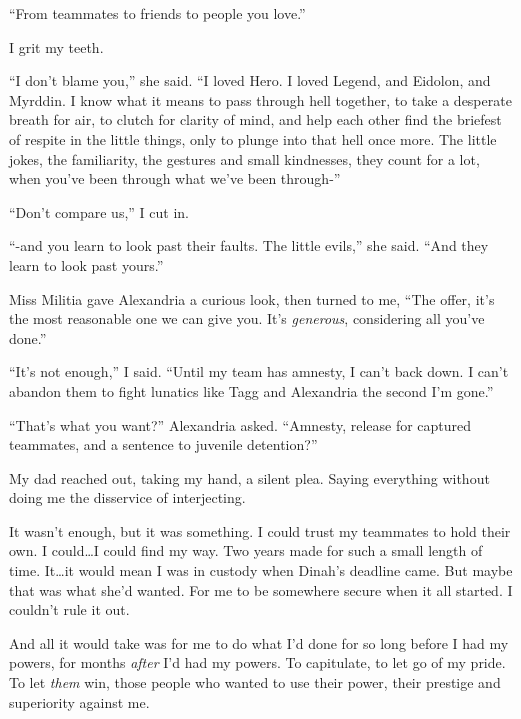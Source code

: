 ``From teammates to friends to people you love.''



I grit my teeth.



``I don't blame you,'' she said.  ``I loved Hero.  I loved Legend, and Eidolon, and Myrddin.  I know what it means to pass through hell together, to take a desperate breath for air, to clutch for clarity of mind, and help each other find the briefest of respite in the little things, only to plunge into that hell once more.  The little jokes, the familiarity, the gestures and small kindnesses, they count for a lot, when you've been through what we've been through-''



``Don't compare us,'' I cut in.



``-and you learn to look past their faults.  The little evils,'' she said.  ``And they learn to look past yours.''



Miss Militia gave Alexandria a curious look, then turned to me, ``The offer, it's the most reasonable one we can give you.  It's \emph{generous}, considering all you've done.''



``It's not enough,'' I said.  ``Until my team has amnesty, I can't back down.  I can't abandon them to fight lunatics like Tagg and Alexandria the second I'm gone.''



``That's what you want?'' Alexandria asked.  ``Amnesty, release for captured teammates, and a sentence to juvenile detention?''



My dad reached out, taking my hand, a silent plea.  Saying everything without doing me the disservice of interjecting.



It wasn't enough, but it was something.  I could trust my teammates to hold their own.  I could\ldots I could find my way.  Two years made for such a small length of time.  It\ldots it would mean I was in custody when Dinah's deadline came.  But maybe that was what she'd wanted.  For me to be somewhere secure when it all started.  I couldn't rule it out.



And all it would take was for me to do what I'd done for so long before I had my powers, for months \emph{after} I'd had my powers.  To capitulate, to let go of my pride.  To let \emph{them }win, those people who wanted to use their power, their prestige and superiority against me.



